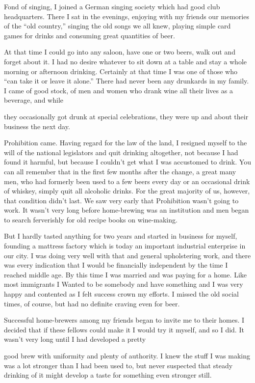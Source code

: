 \begin{biblechapter}
Fond of singing, I joined a German singing society which had good club headquarters. There I sat in the evenings, enjoying with my friends our memories of the “old country,” singing the old songs we all knew, playing simple card games for drinks and consuming great quantities of beer.

At that time I could go into any saloon, have one or two beers, walk out and forget about it. I had no desire whatever to sit down at a table and stay a whole morning or afternoon drinking. Certainly at that time I was one of those who “can take it or leave it alone.” There had never been any drunkards in my family. I came of good stock, of men and women who drank wine all their lives as a beverage, and while

they occasionally got drunk at special celebrations, they were up and about their business the next day.

Prohibition came. Having regard for the law of the land, I resigned myself to the will of the national legislators and quit drinking altogether, not because I had found it harmful, but because I couldn’t get what I was accustomed to drink. You can all remember that in the first few months after the change, a great many men, who had formerly been used to a few beers every day or an occasional drink of whiskey, simply quit all alcoholic drinks. For the great majority of us, however, that condition didn’t last. We saw very early that Prohibition wasn’t going to work. It wasn’t very long before home-brewing was an institution and men began to search ferverishly for old recipe books on wine-making.

But I hardly tasted anything for two years and started in business for myself, founding a mattress factory which is today an important industrial enterprise in our city. I was doing very well with that and general upholstering work, and there was every indication that I would be financially independent by the time I reached middle age. By this time I was married and was paying for a home. Like most immigrants I Wanted to be somebody and have something and I was very happy and contented as I felt success crown my efforts. I missed the old social times, of course, but had no definite craving even for beer.

Successful home-brewers among my friends began to invite me to their homes. I decided that if these fellows could make it I would try it myself, and so I did. It wasn’t very long until I had developed a pretty

good brew with uniformity and plenty of authority. I knew the stuff I was making was a lot stronger than I had been used to, but never suspected that steady drinking of it might develop a taste for something even stronger still.


\end{biblechapter}
